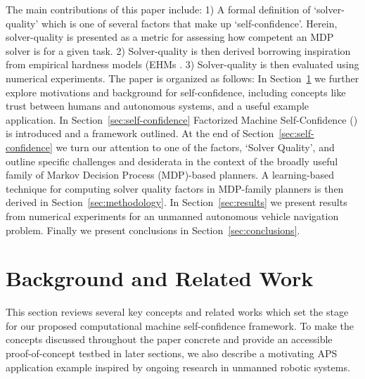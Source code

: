 The main contributions of this paper include: 1) A formal definition of `solver-quality' which is one of several factors that make up `self-confidence'. Herein, solver-quality is presented as a metric for assessing how competent an MDP solver is for a given task. 2) Solver-quality is then derived borrowing inspiration from empirical hardness models (EHMs \cite{Leyton-Brown2009-yr}. 3) Solver-quality is then evaluated using numerical experiments. The paper is organized as follows: In Section~\ref{sec:background} we further explore motivations and background for self-confidence, including concepts like trust between humans and autonomous systems, and a useful example application. In Section~\ref{sec:self-confidence} Factorized Machine Self-Confidence (\famsec) is introduced and a framework outlined. At the end of Section~\ref{sec:self-confidence} we turn our attention to one of the \famsec{} factors, `Solver Quality', and outline specific challenges and desiderata in the context of the broadly useful family of Markov Decision Process (MDP)-based planners. A learning-based technique for computing solver quality factors in MDP-family planners is then derived in Section~\ref{sec:methodology}. In Section~\ref{sec:results} we present results from numerical experiments for an unmanned autonomous vehicle navigation problem. Finally we present conclusions in Section~\ref{sec:conclusions}.

\section{Background and Related Work} \label{sec:background}
This section reviews several key concepts and related works which set the stage for our proposed computational machine self-confidence framework. To make the concepts discussed throughout the paper concrete and provide an accessible proof-of-concept testbed in later sections, we also describe a motivating APS application example inspired by ongoing research in unmanned robotic systems.  

